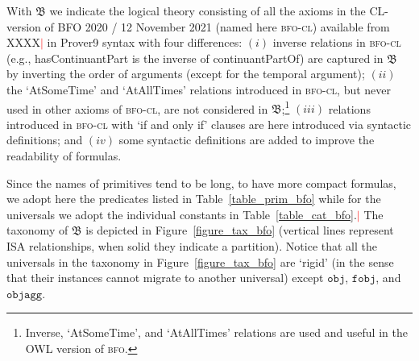 \documentclass[ao]{iosart2x}
\newcommand{\nb}[1]{\textcolor{red}{$|$}\marginpar{\hspace*{-0cm}\parbox{20mm}{\scriptsize\raggedright\textcolor{red}{#1}}}}
\newcommand{\bfoDefLabel}{\textrm{d$_\texttt{b}$}}
\newcommand{\refbfodf}[1]{({\bfoDefLabel}\ref{#1})}
\newcommand{\cn}[1]{\mathtt{#1}}
\newcommand{\dolce}{{\textsc{dolce}}}
\newcommand{\bfo}{{\textsc{bfo}}}
\newcommand{\bfocl}{{\textsc{bfo-cl}}}
\newcommand {\thbfo} {\ensuremath{\mathfrak{B}}}
\newcommand{\objbcat}{\cn{obj}}
\newcommand{\fobjbcat}{\cn{fobj}}
\newcommand{\objaggbcat}{\cn{objagg}}
\begin{document}
%
With $\thbfo$ we indicate the logical theory consisting of all the axioms in the CL-version of BFO 2020 / 12 November 2021 (named here {\bfocl}) available from XXXX\nb{add sito web} in Prover9 syntax with four differences: $(i)$ inverse relations in {\bfocl} (e.g., hasContinuantPart is the inverse of continuantPartOf) are captured in $\thbfo$ by inverting the order of arguments (except for the temporal argument);  $(ii)$ the `AtSomeTime' and `AtAllTimes' relations introduced in {\bfocl}, but never used in other axioms of {\bfocl}, are not considered in $\thbfo$;\footnote{Inverse, `AtSomeTime', and `AtAllTimes' relations are used and useful in the OWL version of {\bfo}.} $(iii)$ relations introduced in {\bfocl} with `if and only if' clauses are here introduced via syntactic definitions;
and $(iv)$ some syntactic definitions are added to improve the readability of formulas.

Since the names of primitives tend to be long, to have more compact formulas, we adopt here the predicates listed in Table~\ref{table_prim_bfo} while for the universals we adopt the individual constants in Table~\ref{table_cat_bfo}.\nb{CM: aggiungere nelle tabelle le primitive che si trovano nel file CL} The taxonomy of $\thbfo$ is depicted in Figure~\ref{figure_tax_bfo} (vertical lines represent ISA relationships, when solid they indicate a partition). Notice that all the universals in the taxonomy in Figure~\ref{figure_tax_bfo} are `rigid' (in the sense that their instances cannot migrate to another universal) except $\objbcat$, $\fobjbcat$, and $\objaggbcat$. %

\end{document}
